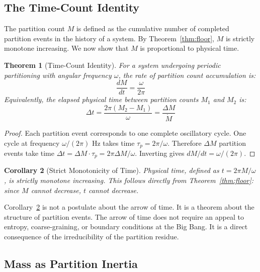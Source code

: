 \documentclass[11pt,twocolumn,a4paper]{article}
\theoremstyle{plain}
\newtheorem{theorem}{Theorem}[section]
\newtheorem{corollary}[theorem]{Corollary}
\theoremstyle{definition}
\theoremstyle{remark}
\begin{document}
\subsection{The Time-Count Identity}
\label{subsec:time_count}

The partition count $M$ is defined as the cumulative number of completed
partition events in the history of a system. By Theorem~\ref{thm:floor}, $M$
is strictly monotone increasing. We now show that $M$ is proportional to
physical time.

\begin{theorem}[Time-Count Identity]
\label{thm:time_count}
For a system undergoing periodic partitioning with angular frequency $\omega$,
the rate of partition count accumulation is:
\begin{equation}
    \frac{dM}{dt} = \frac{\omega}{2\pi}
    \label{eq:time_count}
\end{equation}
Equivalently, the elapsed physical time between partition counts $M_1$ and
$M_2$ is:
\begin{equation}
    \Delta t = \frac{2\pi(M_2 - M_1)}{\omega} = \frac{\Delta M}{\dot{M}}
    \label{eq:time_from_count}
\end{equation}
\end{theorem}

\begin{proof}
Each partition event corresponds to one complete oscillatory cycle. One cycle
at frequency $\omega/(2\pi)$ Hz takes time $\tau_p = 2\pi/\omega$. Therefore
$\Delta M$ partition events take time $\Delta t = \Delta M \cdot \tau_p =
2\pi \Delta M / \omega$. Inverting gives $dM/dt = \omega/(2\pi)$.
\end{proof}

\begin{corollary}[Strict Monotonicity of Time]
\label{cor:time_mono}
Physical time, defined as $t = 2\pi M / \omega$, is strictly monotone
increasing. This follows directly from Theorem~\ref{thm:floor}: since $M$
cannot decrease, $t$ cannot decrease.
\end{corollary}

Corollary~\ref{cor:time_mono} is not a postulate about the arrow of time. It is
a theorem about the structure of partition events. The arrow of time does not
require an appeal to entropy, coarse-graining, or boundary conditions at the Big
Bang. It is a direct consequence of the irreducibility of the partition residue.

\subsection{Mass as Partition Inertia}
\label{subsec:mass}
\end{document}

